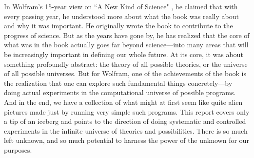 \documentclass[12pt]{article}
\numberwithin{figure}{section} %
\begin{document}
In Wolfram's 15-year view on “A New Kind of Science" \cite{15 year view}, he claimed that with every passing year, he understood more about what the book was really about and why it was important. He originally wrote the book to contribute to the progress of science. But as the years have gone by, he has realized that the core of what was in the book actually goes far beyond science—into many areas that will be increasingly important in defining our whole future. At its core, it was about something profoundly abstract: the theory of all possible theories, or the universe of all possible universes. But for Wolfram, one of the achievements of the book is the realization that one can explore such fundamental things concretely—by doing actual experiments in the computational universe of possible programs. And in the end, we have a collection of what might at first seem like quite alien pictures made just by running very simple such programs. This report covers only a tip of an iceberg and points to the direction of doing systematic and controlled experiments in the infinite universe of theories and possibilities. There is so much left unknown, and so much potential to harness the power of the unknown for our purposes. 
\newpage
\end{document}
